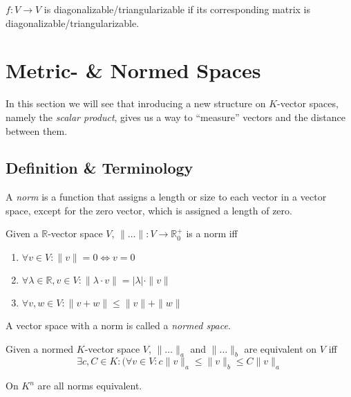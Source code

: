 \begin{definition}
   \(f: V \to V\) is diagonalizable/triangularizable if its corresponding matrix is diagonalizable/triangularizable.
\end{definition}

\newpage

\section{Metric- \& Normed Spaces}
In this section we will see that inroducing a new structure on \(K\)-vector spaces, namely the \emph{scalar product}, gives us a way to ``measure'' vectors and the distance between them.

\subsection{Definition \& Terminology}
A \emph{norm} is a function that assigns a length or size to each vector in a vector space, except for the zero vector, which is assigned a length of zero.

\begin{definition}[Norm]\label{def:norm}
   Given a \(\mathbb{R}\)-vector space \(V\), \(\|\ldots\|: V \to \mathbb{R}_0^+\) is a norm iff
   \begin{enumerate}[label=\roman*, align=Center]
      \item \(\forall v \in V: \|v\| = 0 \iff v = 0\)
      \item \(\forall \lambda \in \mathbb{R}, v \in V: \|\lambda \cdot v\| = |\lambda| \cdot \|v\|\)
      \item \(\forall v, w \in V: \|v + w\| \leq \|v\| + \|w\|\)
   \end{enumerate}
\end{definition}
\begin{remark}
   A vector space with a norm is called a \emph{normed space}.
\end{remark}

\begin{definition}
   Given a normed \(K\)-vector space \(V\), \(\|\ldots\|_a\) and \(\|\ldots\|_b\) are equivalent on \(V\) iff
   \[\exists c, C \in K: \big(\forall v \in V: c \|v\|_a \leq \|v\|_b \leq C \|v\|_a\]
\end{definition}

\begin{theorem}
   On \(K^n\) are all norms equivalent.
\end{theorem}

